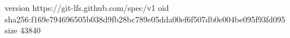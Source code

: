 version https://git-lfs.github.com/spec/v1
oid sha256:f169e794696505b038d9fb28bc789e05dda00ef6f507db0e004be095f93fd095
size 43840
